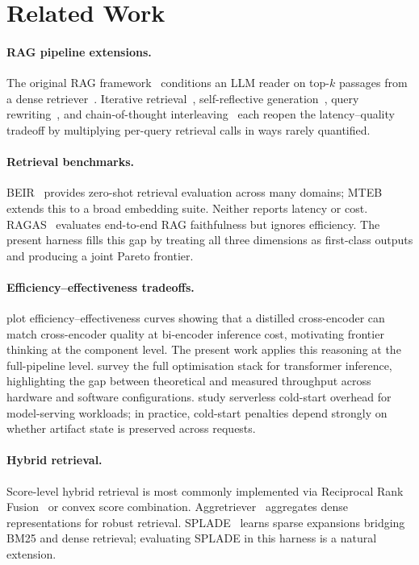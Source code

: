 \documentclass[11pt,a4paper]{article}
\begin{document}
\section{Related Work}
\label{sec:related}

\paragraph{RAG pipeline extensions.}
The original RAG framework~\citep{lewis2020rag} conditions an LLM reader on
top-$k$ passages from a dense retriever~\citep{karpukhin2020dpr}.
Iterative retrieval~\citep{shao2023iter}, self-reflective
generation~\citep{asai2024selfrag}, query rewriting~\citep{ma2023query},
and chain-of-thought interleaving~\citep{trivedi2023interleaving} each reopen
the latency--quality tradeoff by multiplying per-query retrieval calls in ways
rarely quantified.

\paragraph{Retrieval benchmarks.}
BEIR~\citep{thakur2021beir} provides zero-shot retrieval evaluation across many
domains; MTEB~\citep{muennighoff2023mteb} extends this to a broad embedding
suite.
Neither reports latency or cost.
RAGAS~\citep{es2023ragas} evaluates end-to-end RAG faithfulness but ignores
efficiency.
The present harness fills this gap by treating all three dimensions as
first-class outputs and producing a joint Pareto frontier.

\paragraph{Efficiency--effectiveness tradeoffs.}
\citet{hofstaetter2022efficiently} plot efficiency--effectiveness curves showing
that a distilled cross-encoder can match cross-encoder quality at bi-encoder
inference cost, motivating frontier thinking at the component level.
The present work applies this reasoning at the full-pipeline level.
\citet{kim2023full} survey the full optimisation stack for transformer inference,
highlighting the gap between theoretical and measured throughput across hardware
and software configurations.
\citet{oakes2022cold} study serverless cold-start overhead for model-serving
workloads; in practice, cold-start penalties depend strongly on whether artifact
state is preserved across requests.

\paragraph{Hybrid retrieval.}
Score-level hybrid retrieval is most commonly implemented via Reciprocal Rank
Fusion~\citep{cormack2009rrf} or convex score combination.
Aggretriever~\citep{lin2022aggretriever} aggregates dense representations for
robust retrieval.
SPLADE~\citep{formal2021splade,formal2022splade2} learns sparse expansions
bridging BM25 and dense retrieval; evaluating SPLADE in this harness is a
natural extension.
\end{document}
